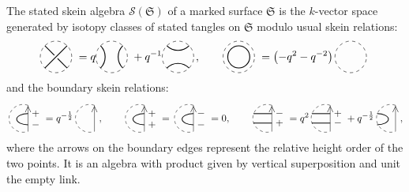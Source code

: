 \documentclass[11pt]{article}
\numberwithin{equation}{section}
\numberwithin{equation}{section}
\newcommand{\Kaufhoriz}{\begin{tikzpicture}[scale = 0.5, baseline = -3pt]
\draw[dashed] (0,0) circle(1);
\draw[thick] (45:1) arc (-45:-135:1);
\draw[thick] (-45:1) arc (45:135:1);
\end{tikzpicture}}
\newcommand{\Kaufvert}{\begin{tikzpicture}[scale = 0.5, baseline = -3pt]
\draw[dashed] (0,0) circle(1);
\draw[thick] (45:1) arc (135:225:1);
\draw[thick] (135:1) arc (45:-45:1);
\end{tikzpicture}}
\newcommand{\Kauftresse}{\begin{tikzpicture}[scale = 0.5, baseline = -3pt]
\draw[dashed] (0,0) circle(1);
\draw[thick] (-45:1) -- (135:1) node[fill, color= white, pos = 0.5, circle, scale = 0.45]{};
\draw[thick] (45:1) -- (-135:1);
\end{tikzpicture}}
\newcommand{\Kaufcirc}{\begin{tikzpicture}[scale = 0.5, baseline = -3pt]
\draw[dashed] (0,0) circle(1);
\draw[thick] (0,0) circle(0.7);
\end{tikzpicture}}
\newcommand{\Kaufvide}{\begin{tikzpicture}[scale = 0.5, baseline = -3pt]
\draw[dashed] (0,0) circle(1);
\end{tikzpicture}}
\begin{document}
\begin{Definition}
The stated skein algebra $\mathscr{S}(\mathfrak{S})$ of a marked surface $\mathfrak{S}$ is the $k$-vector space generated by isotopy classes of stated tangles on $\mathfrak{S}$ modulo usual skein relations:
\[
\Kauftresse \ = q \Kaufvert\ + q^{-1} \Kaufhoriz\,, \qquad
\Kaufcirc \ = \big({-}q^2-q^{-2}\big)\, \Kaufvide\
\]
and the boundary skein relations:
\[
\begin{tikzpicture}[scale = 0.5, baseline = -3pt]
\draw[dashed] (70:1) arc(70:290:1);
\draw (-70:1) -- (70:1) node[pos = 0.85,sloped]{\small $>$};
\draw[thick] (70:1)++ (0,-0.6) node[right]{\small $+$} arc(90:270:0.8 and 0.4) node[right]{\small $-$};
\end{tikzpicture}
= q^{-\frac{1}{2}} \begin{tikzpicture}[scale = 0.5, baseline = -3pt]
\draw[dashed] (70:1) arc(70:290:1);
\draw (-70:1) -- (70:1) node[pos = 0.85,sloped]{\small $>$};
\end{tikzpicture}\!, \qquad
\begin{tikzpicture}[scale = 0.5, baseline = -3pt]
\draw[dashed] (70:1) arc(70:290:1);
\draw (-70:1) -- (70:1) node[pos = 0.85,sloped]{\small $>$};
\draw[thick] (70:1)++ (0,-0.6) node[right]{\small $+$} arc(90:270:0.8 and 0.4) node[right]{\small $+$};
\end{tikzpicture} = \begin{tikzpicture}[scale = 0.5, baseline = -3pt]
\draw[dashed] (70:1) arc(70:290:1);
\draw (-70:1) -- (70:1) node[pos = 0.85,sloped]{\small $>$};
\draw[thick] (70:1)++ (0,-0.6) node[right]{\small $-$} arc(90:270:0.8 and 0.4) node[right]{\small $-$};
\end{tikzpicture} = 0,
\qquad
\begin{tikzpicture}[scale = 0.5, baseline = -3pt]
\draw[dashed] (70:1) arc(70:290:1);
\draw (-70:1) -- (70:1) node[pos = 0.85,sloped]{\small $>$};
\draw[thick] (70:1)++ (0,-0.6) node[right]{\small $-$} -- ++(-1.3,0);
\draw[thick] (-70:1)++ (0,0.6) node[right]{\small $+$} -- ++(-1.3,0);
\end{tikzpicture}
=q^2 \begin{tikzpicture}[scale = 0.5, baseline = -3pt]
\draw[dashed] (70:1) arc(70:290:1);
\draw (-70:1) -- (70:1) node[pos = 0.85,sloped]{\small $>$};
\draw[thick] (70:1)++ (0,-0.6) node[right]{\small $+$} -- ++(-1.3,0);
\draw[thick] (-70:1)++ (0,0.6) node[right]{\small $-$} -- ++(-1.3,0);
\end{tikzpicture}
+q^{-\frac{1}{2}} \begin{tikzpicture}[scale = 0.5, baseline = -3pt]
\draw[dashed] (70:1) arc(70:290:1);
\draw (-70:1) -- (70:1) node[pos = 0.85,sloped]{\small $>$};
\draw[thick] (70:1)++ (-1.3,-0.6) arc(90:-90:0.8 and 0.4);
\end{tikzpicture}\!,
\]
where the arrows on the boundary edges represent the relative height order of the two points.
It is an algebra with product given by vertical superposition and unit the empty link.


\end{Definition}
\end{document}
